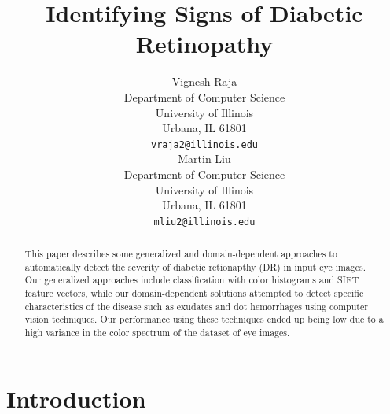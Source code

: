\documentclass{article} %
\title{Identifying Signs of Diabetic Retinopathy}
\author{
Vignesh Raja\\
Department of Computer Science\\
University of Illinois\\
Urbana, IL 61801 \\
\texttt{vraja2@illinois.edu} \\
\And
Martin Liu \\
Department of Computer Science \\
University of Illinois\\
Urbana, IL 61801 \\
\texttt{mliu2@illinois.edu} \\
}
\begin{document}
\maketitle

\begin{abstract}
This paper describes some generalized and domain-dependent approaches to automatically detect the severity of diabetic retionapthy (DR) in input eye images. Our generalized approaches include classification with color histograms and SIFT feature vectors, while our domain-dependent solutions attempted to detect specific characteristics of the disease such as exudates and dot hemorrhages using computer vision techniques. Our performance using these techniques ended up being low due to a high variance in the color spectrum of the dataset of eye images.
\end{abstract}

\section{Introduction}
\end{document}
